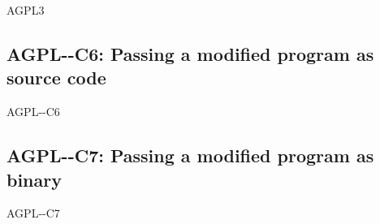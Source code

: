 \begin{license}{AGPL3}
\subsection{AGPL-\ver-C6: Passing a modified program as source code}
\begin{lsuc}{AGPL-\ver-C6}
  \label{OSUC-04S-AGPL}

  \useCaseSix

  \begin{lsucrequires}
    \lsucmandatory{\keepLicenseElements}
    \lsucmandatory{\gplthreeEnsureCopyrightNoticeSource}
    \lsucmandatory{\giveLicense}\passingFilesCorrectly
    \lsucmandatory{\retainCopyrightNotices}
    \lsucmandatory{\addToCopyrightDialogApp}
    \lsucmandatory{\markProgramModifications}
    \lsucmandatory{\arrangeProgramChanges}\howToApplyTheseTerms
    \lsucoptional{\createChangelog}
    \lsucoptional{\addToDocumentation}
  \end{lsucrequires}

  \begin{lsucprohibits}
    \lsucitem{\noPatentLitigation}
  \end{lsucprohibits}
\end{lsuc}

\subsection{AGPL-\ver-C7: Passing a modified program as binary}
\begin{lsuc}{AGPL-\ver-C7}
  \label{OSUC-04B-AGPL}

  \useCaseSeven

  \begin{lsucrequires}
    \lsucmandatory{\keepLicenseElements}
    \lsucmandatory{\gplthreeEnsureCopyrightNoticeBinary}
    \lsucmandatory{\giveLicense}\passingFilesCorrectly
    \lsucmandatory{\retainCopyrightNotices}
    \lsucmandatory{\markProgramModifications}
    \lsucmandatory{\addToCopyrightDialogApp}
    \lsucmandatory{\arrangeProgramChanges}\howToApplyTheseTerms
    \lsucmandatory{\makeModifiedSourceAvailable}
    \lsucmandatory{\describeHowToGetSource}
    \lsucoptional{\createChangelog}
    \lsucoptional{\addToDocumentation}
  \end{lsucrequires}

  \begin{lsucprohibits}
    \lsucitem{\noPatentLitigation}
  \end{lsucprohibits}
\end{lsuc}


\end{license}
